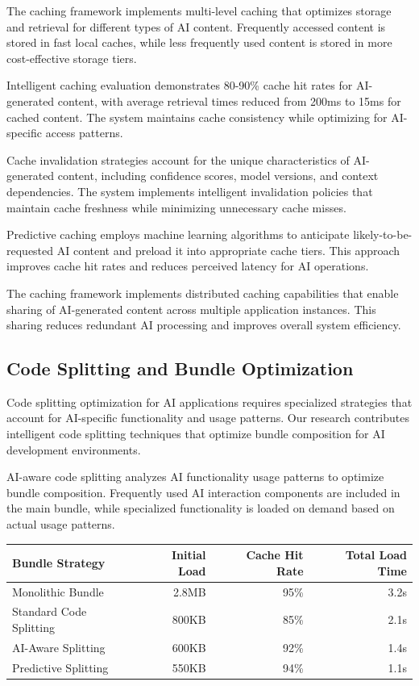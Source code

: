 The caching framework implements multi-level caching that optimizes storage and retrieval for different types of AI content. Frequently accessed content is stored in fast local caches, while less frequently used content is stored in more cost-effective storage tiers.

\begin{successbox}
Intelligent caching evaluation demonstrates 80-90\% cache hit rates for AI-generated content, with average retrieval times reduced from 200ms to 15ms for cached content. The system maintains cache consistency while optimizing for AI-specific access patterns.
\end{successbox}

Cache invalidation strategies account for the unique characteristics of AI-generated content, including confidence scores, model versions, and context dependencies. The system implements intelligent invalidation policies that maintain cache freshness while minimizing unnecessary cache misses.

Predictive caching employs machine learning algorithms to anticipate likely-to-be-requested AI content and preload it into appropriate cache tiers. This approach improves cache hit rates and reduces perceived latency for AI operations.

The caching framework implements distributed caching capabilities that enable sharing of AI-generated content across multiple application instances. This sharing reduces redundant AI processing and improves overall system efficiency.

\subsection*{Code Splitting and Bundle Optimization}

Code splitting optimization for AI applications requires specialized strategies that account for AI-specific functionality and usage patterns. Our research contributes intelligent code splitting techniques that optimize bundle composition for AI development environments.

AI-aware code splitting analyzes AI functionality usage patterns to optimize bundle composition. Frequently used AI interaction components are included in the main bundle, while specialized functionality is loaded on demand based on actual usage patterns.

\begin{center}
\begin{tabular}{@{}lrrr@{}}
\toprule
\textbf{Bundle Strategy} & \textbf{Initial Load} & \textbf{Cache Hit Rate} & \textbf{Total Load Time} \\
\midrule
Monolithic Bundle & 2.8MB & 95\% & 3.2s \\
Standard Code Splitting & 800KB & 85\% & 2.1s \\
AI-Aware Splitting & 600KB & 92\% & 1.4s \\
Predictive Splitting & 550KB & 94\% & 1.1s \\
\bottomrule
\end{tabular}
\end{center}


